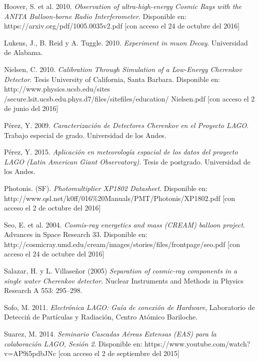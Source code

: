 \documentclass{book}
\begin{document}
\begin{thebibliography}{9}
 Hoover, S. et al. 2010. \textit{Observation of ultra-high-energy Cosmic Rays with the ANITA Balloon-borne Radio Interferometer}. Disponible en: https://arxiv.org/pdf/1005.0035v2.pdf [con acceso el 24 de octubre del 2016]

 Lukens, J., B. Reid y A. Tuggle.  2010. \textit{Experiment in muon Decay}. Universidad de Alabama.

 Nielsen, C.  2010. \textit{Calibration Through Simulation of a Low-Energy Cherenkov Detector}. Tesis University of California, Santa Barbara. Disponible en: http://www.physics.ucsb.edu/sites\\/secure.lsit.ucsb.edu.phys.d7/files/sitefiles/education/ Nielsen.pdf [con acceso el 2 de junio del 2016]

 P\'erez, Y. 2009. \textit{Caracterizaci\'on de Detectores Cherenkov en el Proyecto LAGO}. Trabajo especial de grado. Universidad de los Andes.

 P\'erez, Y. 2015. \textit{Aplicaci\'on en meteorolog\'ia espacial de los datos del proyecto LAGO (Latin American Giant Observatory)}. Tesis de postgrado. Universidad de los Andes.

 Photonis. (SF). \textit{Photomultiplier XP1802 Datasheet}. Disponible en: http://www.qsl.net/k0ff/016\%20Manuals/PMT/Photonis/XP1802.pdf [con acceso el 2 de octubre del 2016]

 Seo, E. et al. 2004. \textit{Cosmis-ray energetics and mass (CREAM) balloon project}. Advances in Space Research 33. Disponible en: http://cosmicray.umd.edu/cream/images/stories/files/frontpage/seo.pdf [con acceso el 24 de octubre del 2016]

 Salazar, H. y L. Villase\~nor (2005) \textit{Separation of cosmic-ray components in a single water Cherenkov detector}. Nuclear Instruments and Methods in Physics Research A 553: 295–298.

 Sofo, M. 2011. \textit{Electr\'onica LAGO: Gu\'ia de conexi\'on de Hardware}, Laboratorio de Detecci\'n de Part\'iculas y Radiaci\'on, Centro At\'omico Bariloche.

 Suarez, M. 2014. \textit{Seminario Cascadas A\'ereas Extensas (EAS) para la colaboraci\'on LAGO, Sesi\'on 2}. Disponible en: https://www.youtube.com/watch?v=AP9i5pdbJNc [con acceso el 2 de septiembre del 2015]


\end{thebibliography}
\end{document}
